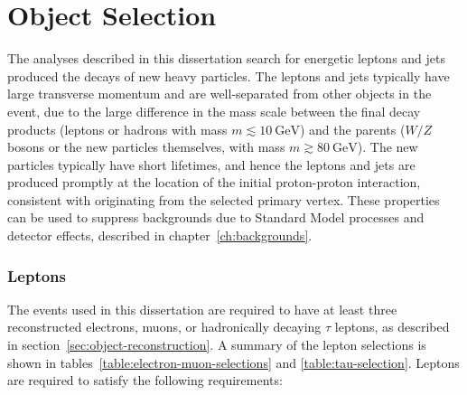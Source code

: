 \section{Object Selection}\label{sec:model-independent-object-definitions}
The analyses described in this dissertation search for energetic leptons and jets produced the decays of new heavy particles. The leptons and jets typically have large transverse momentum and are well-separated from other objects in the event, due to the large difference in the mass scale between the final decay products (leptons or hadrons with mass $m\lesssim\SI{10}{\giga\electronvolt}$) and the parents ($W/Z$ bosons or the new particles themselves, with mass $m\gtrsim\SI{80}{\giga\electronvolt}$). The new particles typically have short lifetimes, and hence the leptons and jets are produced promptly at the location of the initial proton-proton interaction, consistent with originating from the selected primary vertex. These properties can be used to suppress backgrounds due to Standard Model processes and detector effects, described in chapter~\ref{ch:backgrounds}. 

\subsubsection{Leptons}\label{sec:model-independent-lepton-definitions}

The events used in this dissertation are required to have at least three reconstructed electrons, muons, or hadronically decaying $\tau$ leptons, as described in section~\ref{sec:object-reconstruction}. A summary of the lepton selections is shown in tables~\ref{table:electron-muon-selections} and \ref{table:tau-selection}. Leptons are required to satisfy the following requirements:

